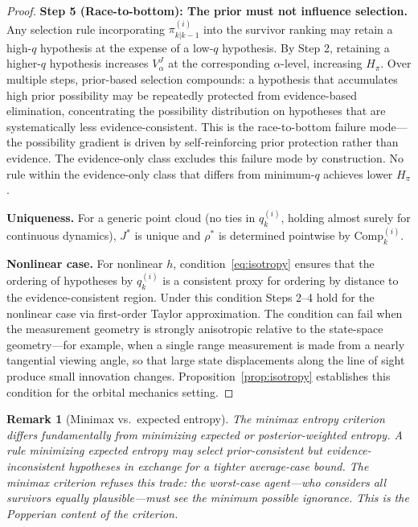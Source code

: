 \documentclass[12pt]{article}
\newtheorem{remark}[theorem]{Remark}
\begin{document}
\begin{proof}
\textbf{Step 5 (Race-to-bottom): The prior must not influence selection.} Any selection rule incorporating $\pi^{(i)}_{k|k-1}$ into the survivor ranking may retain a high-$q$ hypothesis at the expense of a low-$q$ hypothesis. By Step 2, retaining a higher-$q$ hypothesis increases $V^J_\alpha$ at the corresponding $\alpha$-level, increasing $H_\pi$. Over multiple steps, prior-based selection compounds: a hypothesis that accumulates high prior possibility may be repeatedly protected from evidence-based elimination, concentrating the possibility distribution on hypotheses that are systematically less evidence-consistent. This is the race-to-bottom failure mode---the possibility gradient is driven by self-reinforcing prior protection rather than evidence. The evidence-only class excludes this failure mode by construction. No rule within the evidence-only class that differs from minimum-$q$ achieves lower $H_\pi$.

\textbf{Uniqueness.} For a generic point cloud (no ties in $q^{(i)}_k$, holding almost surely for continuous dynamics), $J^*$ is unique and $\rho^*$ is determined pointwise by $\mathrm{Comp}^{(i)}_k$.

\textbf{Nonlinear case.} For nonlinear $h$, condition~\eqref{eq:isotropy} ensures that the ordering of hypotheses by $q^{(i)}_k$ is a consistent proxy for ordering by distance to the evidence-consistent region. Under this condition Steps 2--4 hold for the nonlinear case via first-order Taylor approximation. The condition can fail when the measurement geometry is strongly anisotropic relative to the state-space geometry---for example, when a single range measurement is made from a nearly tangential viewing angle, so that large state displacements along the line of sight produce small innovation changes. Proposition~\ref{prop:isotropy} establishes this condition for the orbital mechanics setting.
\end{proof}

\begin{remark}[Minimax vs.\ expected entropy]
The minimax entropy criterion differs fundamentally from minimizing expected or posterior-weighted entropy. A rule minimizing expected entropy may select prior-consistent but evidence-inconsistent hypotheses in exchange for a tighter average-case bound. The minimax criterion refuses this trade: the worst-case agent---who considers all survivors equally plausible---must see the minimum possible ignorance. This is the Popperian content of the criterion.
\end{remark}
\end{document}
